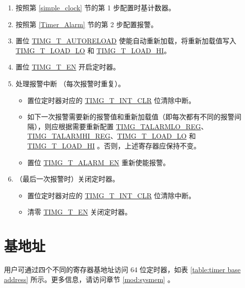 \documentclass[main\_\_CN.tex]{subfiles}
\begin{document}
\begin{enumerate}
    \item 按照第 \ref{simple_clock} 节的第 1 步配置时基计数器。
    \item 按照第 \ref{Timer_Alarm} 节的第 2 步配置报警。
    \item 置位 \hyperref[fielddesc:TIMGTXAUTORELOAD]{TIMG\_T\_AUTORELOAD} 使能自动重新加载，将重新加载值写入 \hyperref[fielddesc:TIMGTXLOADLO]{TIMG\_T\_LOAD\_LO} 和 \hyperref[fielddesc:TIMGTXLOADHI]{TIMG\_T\_LOAD\_HI}。
    \item 置位 \hyperref[fielddesc:TIMGTXEN]{TIMG\_T\_EN} 开启定时器。
    \item 处理报警中断 （每次报警时重复）。
    \begin{itemize}
        \item 置位定时器对应的 \hyperref[fielddesc:TIMGTXINTCLR]{TIMG\_T\_INT\_CLR} 位清除中断。
        \item 如下一次报警需要新的报警值和重新加载值（即每次都有不同的报警间隔），则应根据需要重新配置 \hyperref[regdesc:TIMGTXALARMLOREG]{TIMG\_TALARMLO\_REG}、\hyperref[regdesc:TIMGTXALARMHIREG]{TIMG\_TALARMHI\_REG}、\hyperref[fielddesc:TIMGTXLOADLO]{TIMG\_T\_LOAD\_LO} 和 \\\hyperref[fielddesc:TIMGTXLOADHI]{TIMG\_T\_LOAD\_HI} 。否则，上述寄存器应保持不变。
        \item 置位 \hyperref[fielddesc:TIMGTXALARMEN]{TIMG\_T\_ALARM\_EN} 重新使能报警。
    \end{itemize}
    \item （最后一次报警时）关闭定时器。
    \begin{itemize}
        \item 置位定时器对应的 \hyperref[fielddesc:TIMGTXINTCLR]{TIMG\_T\_INT\_CLR} 位清除中断。
        \item 清零 \hyperref[fielddesc:TIMGTXEN]{TIMG\_T\_EN} 关闭定时器。
    \end{itemize}
\end{enumerate}

\section{基地址}\label{subsection:timer base address}
用户可通过四个不同的寄存器基地址访问 64 位定时器，如表 \ref{table:timer base address} 所示。更多信息，请访问章节 \ref{mod:sysmem} \textit{}。
\end{document}
